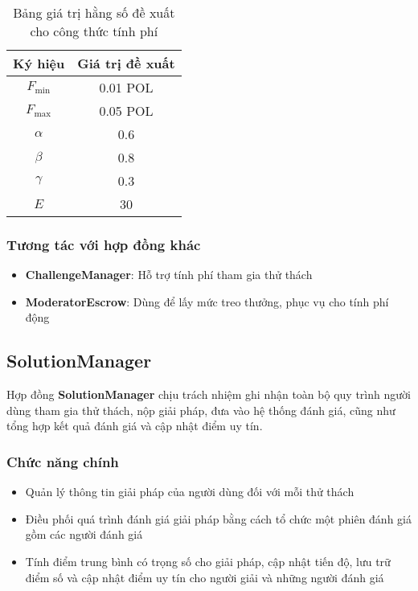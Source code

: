 \begin{table}[H]
  \centering
  \small
  \begin{tabular}{|c|c|}
    \hline
    \textbf{Ký hiệu} & \textbf{Giá trị đề xuất} \\
    \hline
    $F_{\text{min}}$ & 0.01 POL                 \\
    \hline
    $F_{\text{max}}$ & 0.05 POL                 \\
    \hline
    $\alpha$         & 0.6                      \\
    \hline
    $\beta$          & 0.8                      \\
    \hline
    $\gamma$         & 0.3                      \\
    \hline
    $E$              & 30                       \\
    \hline
  \end{tabular}
  \caption{Bảng giá trị hằng số đề xuất cho công thức tính phí}
  \label{tab:suggested-constant-values-for-compute-joining-fee}
\end{table}

\subsubsection{Tương tác với hợp đồng khác}

\begin{itemize}
  \item \textbf{ChallengeManager}: Hỗ trợ tính phí tham gia thử thách
  \item \textbf{ModeratorEscrow}: Dùng để lấy mức treo thưởng, phục vụ cho tính phí động
\end{itemize}

\subsection{SolutionManager}

Hợp đồng \textbf{SolutionManager} chịu trách nhiệm ghi nhận toàn bộ quy trình người dùng tham gia thử thách, nộp giải pháp, đưa vào hệ thống đánh giá, cũng như tổng hợp kết quả đánh giá và cập nhật điểm uy tín.

\subsubsection{Chức năng chính}

\begin{itemize}
  \item Quản lý thông tin giải pháp của người dùng đối với mỗi thử thách
  \item Điều phối quá trình đánh giá giải pháp bằng cách tổ chức một phiên đánh giá gồm các người đánh giá
  \item Tính điểm trung bình có trọng số cho giải pháp, cập nhật tiến độ, lưu trữ điểm số và cập nhật điểm uy tín cho người giải và những người đánh giá
\end{itemize}

